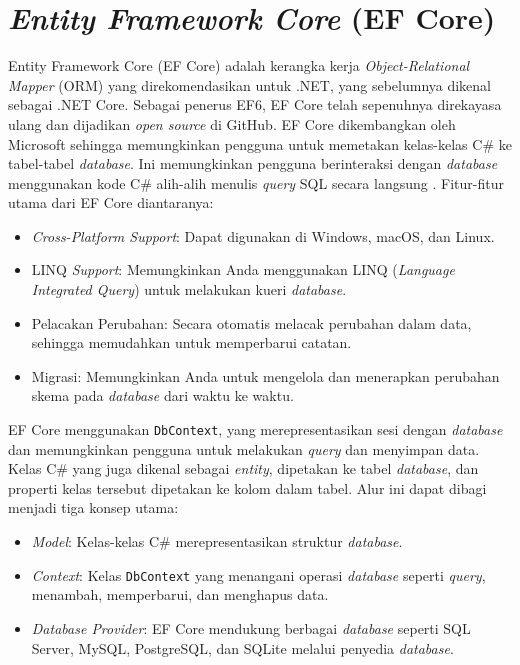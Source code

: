 \section{\emph{Entity Framework Core} (EF Core)}
\label{sec:efcore}

Entity Framework Core (EF Core) adalah kerangka kerja \emph{Object-Relational Mapper} (ORM) yang direkomendasikan untuk .NET, yang sebelumnya dikenal sebagai .NET Core. Sebagai penerus EF6, EF Core telah sepenuhnya direkayasa ulang dan dijadikan \emph{open source} di GitHub. EF Core dikembangkan oleh Microsoft sehingga memungkinkan pengguna untuk memetakan kelas-kelas C\# ke tabel-tabel \emph{database}. Ini memungkinkan pengguna berinteraksi dengan \emph{database} menggunakan kode C\# alih-alih menulis \emph{query} SQL secara langsung \cite{patel_medium_efcore}. Fitur-fitur utama dari EF Core diantaranya:

\begin{itemize}
    \item \emph{Cross-Platform Support}: Dapat digunakan di Windows, macOS, dan Linux.
    \item LINQ \emph{Support}: Memungkinkan Anda menggunakan LINQ (\emph{Language Integrated Query}) untuk melakukan kueri \emph{database}.
    \item Pelacakan Perubahan: Secara otomatis melacak perubahan dalam data, sehingga memudahkan untuk memperbarui catatan.
    \item Migrasi: Memungkinkan Anda untuk mengelola dan menerapkan perubahan skema pada \emph{database} dari waktu ke waktu.
\end{itemize}

EF Core menggunakan \texttt{DbContext}, yang merepresentasikan sesi dengan \emph{database} dan memungkinkan pengguna untuk melakukan \emph{query} dan menyimpan data. Kelas C\# yang juga dikenal sebagai \emph{entity}, dipetakan ke tabel \emph{database}, dan properti kelas tersebut dipetakan ke kolom dalam tabel. Alur ini dapat dibagi menjadi tiga konsep utama:

\begin{itemize}
    \item \emph{Model}: Kelas-kelas C\# merepresentasikan struktur \emph{database}.
    \item \emph{Context}: Kelas \texttt{DbContext} yang menangani operasi \emph{database} seperti \emph{query}, menambah, memperbarui, dan menghapus data.
    \item \emph{Database Provider}: EF Core mendukung berbagai \emph{database} seperti SQL Server, MySQL, PostgreSQL, dan SQLite melalui penyedia \emph{database}.
\end{itemize}

